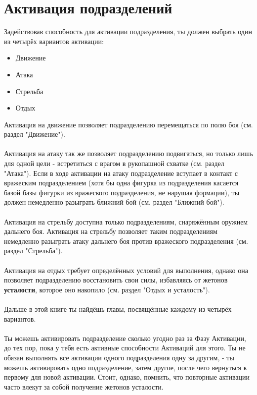 \documentclass[a4paper,11pt,twoside]{article}
\begin{document}
\section*{Активация подразделений}
Задействовав способность для активации подразделения, ты должен выбрать один из четырёх вариантов активации:
\begin{itemize}
	\item Движение
	\item Атака
	\item Стрельба
	\item Отдых
\end{itemize}
Активация на движение позволяет подразделению перемещаться по полю боя (см. раздел "Движение"). \\ \\
Активация на атаку так же позволяет подразделению подвигаться, но только лишь для одной цели - встретиться с врагом в рукопашной схватке (см. раздел "Атака"). Если в ходе активации на атаку подразделение вступает в контакт с вражеским подразделением (хотя бы одна фигурка из подразделения касается базой базы фигурки из вражеского подразделения, не нарушая формации), ты должен немедленно разыграть ближний бой (см. раздел "Ближний бой"). \\ \\
Активация на стрельбу доступна только подразделениям, снаряжённым оружием дальнего боя. Активация на стрельбу позволяет таким подразделениям немедленно разыграть атаку дальнего боя против вражеского подразделения (см. раздел "Стрельба"). \\ \\
Активация на отдых требует определённых условий для выполнения, однако она позволяет подразделению восстановить свои силы, избавляясь от жетонов \textbf{усталости}, которое оно накопило (см. раздел "Отдых и усталость"). \\ \\
Дальше в этой книге ты найдёшь главы, посвящённые каждому из четырёх вариантов. \\ \\
Ты можешь активировать подразделение сколько угодно раз за Фазу Активации, до тех пор, пока у тебя есть активные способности Активаций для этого. Ты не обязан выполнять все активации одного подразделения одну за другим, - ты можешь активировать одно подразделение, затем другое, после чего вернуться к первому для новой активации. Стоит, однако, помнить, что повторные активации часто влекут за собой получение жетонов усталости. \\ \\
\end{document}

